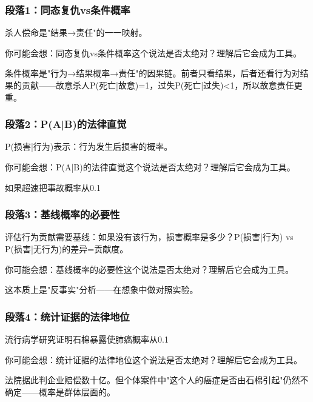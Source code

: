 \documentclass[a4paper,12pt]{book}
\newenvironment{motivation}{\begin{tcolorbox}[colback=gray!10,colframe=gray!60,title=\textit{动机}]\small\itshape}{\end{tcolorbox}}
\begin{document}
\begin{motivation}
\begin{motivation}
\begin{motivation}
	\subsubsection*{段落1：同态复仇vs条件概率}
	杀人偿命是"结果→责任"的一一映射。
	\begin{tcolorbox}[colback=yellow!5, title=\textit{读者行为预测}]
		你可能会想：同态复仇vs条件概率这个说法是否太绝对？理解后它会成为工具。
	\end{tcolorbox}

条件概率是"行为→结果概率→责任"的因果链。前者只看结果，后者还看行为对结果的贡献——故意杀人P(死亡|故意)=1，过失P(死亡|过失)<1，所以故意责任更重。

	\subsubsection*{段落2：P(A|B)的法律直觉}
	P(损害|行为)表示：行为发生后损害的概率。
	\begin{tcolorbox}[colback=yellow!5, title=\textit{读者行为预测}]
		你可能会想：P(A|B)的法律直觉这个说法是否太绝对？理解后它会成为工具。
	\end{tcolorbox}

如果超速把事故概率从0.1%

	\subsubsection*{段落3：基线概率的必要性}
	评估行为贡献需要基线：如果没有该行为，损害概率是多少？P(损害|行为) vs P(损害|无行为)的差异=贡献度。
	\begin{tcolorbox}[colback=yellow!5, title=\textit{读者行为预测}]
		你可能会想：基线概率的必要性这个说法是否太绝对？理解后它会成为工具。
	\end{tcolorbox}

这本质上是"反事实"分析——在想象中做对照实验。

	\subsubsection*{段落4：统计证据的法律地位}
	流行病学研究证明石棉暴露使肺癌概率从0.1%
	\begin{tcolorbox}[colback=yellow!5, title=\textit{读者行为预测}]
		你可能会想：统计证据的法律地位这个说法是否太绝对？理解后它会成为工具。
	\end{tcolorbox}

法院据此判企业赔偿数十亿。但个体案件中"这个人的癌症是否由石棉引起"仍然不确定——概率是群体层面的。


\end{motivation}
\end{motivation}
\end{motivation}
\end{document}
